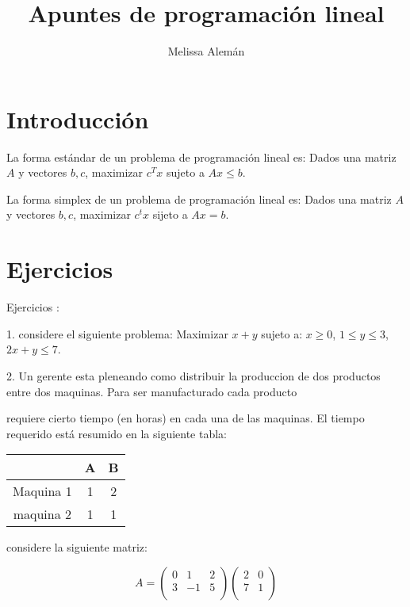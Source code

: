 \documentclass{article}
\title{Apuntes de programación lineal}
\author{Melissa Alemán}
\begin{document}
\maketitle
\tableofcontents
\section{Introducción}
\label{sec:introduccion}

La forma estándar de un problema de programación lineal es: Dados una
matriz $A$ y vectores $b,c$, maximizar $c^Tx$ sujeto a $Ax\leq b$.

La forma simplex de un problema de programación lineal es: Dados una
matriz $A$ y vectores $b,c$, maximizar $c^tx$ sijeto a $Ax = b$.

\bigskip

\section{Ejercicios}
\label{sec:ejercicios}


Ejercicios :

1. considere el siguiente problema:
Maximizar $x+y$ sujeto a: $x \geq 0$, $1 \leq y \leq 3$, $2x+y \leq
7$.

2. Un gerente esta pleneando como distribuir la produccion de dos
productos entre dos maquinas. Para ser manufacturado cada producto

requiere cierto tiempo (en horas) en cada una de las maquinas. El
tiempo requerido está resumido en la siguiente tabla:

\begin{tabular}{|c|c|c|}
  \hline
  &A&B\\
  \hline
  Maquina 1&1&2\\
  maquina 2&1&1\\
  \hline
\end{tabular}

considere la siguiente matriz:

\begin{equation}
  \label{eq:1}
  A=\begin{pmatrix}
    0&1&2\\
    3&-1&5\\
  \end{pmatrix}
  \begin{pmatrix}
    2&0\\
    7&1\\
  \end{pmatrix}
\end{equation}
\end{document}
